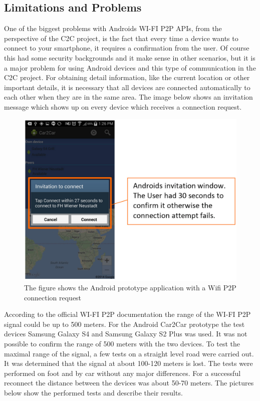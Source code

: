 \subsection*{Limitations and Problems}
\label{subsec:AndroidLimitationsProblems}
One of the biggest problems with Androids WI-FI P2P APIs, from the perspective of the C2C project, is the fact that every time a device wants to connect to your smartphone, it requires a confirmation from the user. Of course this had some security backgrounds and it make sense in other scenarios, but it is a major problem for using Android devices and this type of communication in the C2C project.  For obtaining detail information, like the current location or other important details, it is necessary that all devices are connected automatically to each other when they are in the same area. The image below shows an invitation message which shows up on every device which receives a connection request\cite{wifip2p3}.\newline
 
\begin{figure}[H]
	\centering
  \includegraphics[width=\linewidth,]{images/androidScreen3.eps}
	\caption{The figure shows the Android prototype application with a Wifi P2P connection request}
	\label{fig1}
\end{figure}

\noindent According to the official WI-FI P2P documentation the range of the WI-FI P2P signal could be up to 500 meters. For the Android Car2Car prototype the test devices Samsung Galaxy S4 and Samsung Galaxy S2 Plus was used. It was not possible to confirm the range of 500 meters with the two devices. To test the maximal range of the signal, a few tests on a straight level road were carried out. It was determined that the signal at about 100-120 meters is lost. The tests were performed on foot and by car without any major differences. For a successful reconnect the distance between the devices was about 50-70 meters. The pictures below show the performed tests and describe their results.

